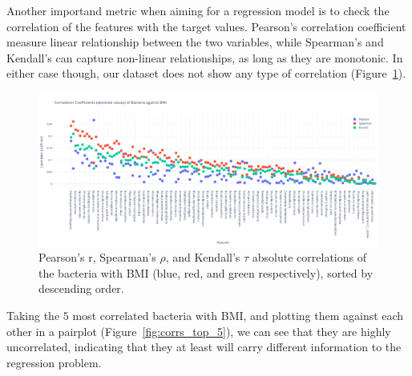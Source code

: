 \documentclass[12pt]{article}
\begin{document}
Another importand metric when aiming for a regression model is to check the
correlation of the features with the target values. Pearson's correlation
coefficient measure linear relationship between the two variables, while
Spearman's and Kendall's can capture non-linear relationships, as long as they
are monotonic. In either case though, our dataset does not show any type of
correlation (Figure~\ref{fig:corrs}).

\begin{figure}[H]
    \centering
    \includegraphics[width=\textwidth]{ims/corr_coeffs.png}
    \caption{Pearson's r, Spearman's $\rho$, and Kendall's $\tau$ absolute
    correlations of the bacteria with BMI (blue, red, and green respectively),
    sorted by descending order.}
    \label{fig:corrs}
\end{figure}

Taking the $5$ most correlated bacteria with BMI, and plotting them against each
other in a pairplot (Figure~\ref{fig:corrs_top_5}), we can see that they are
highly uncorrelated, indicating that they at least will carry different information
to the regression problem.
\end{document}
